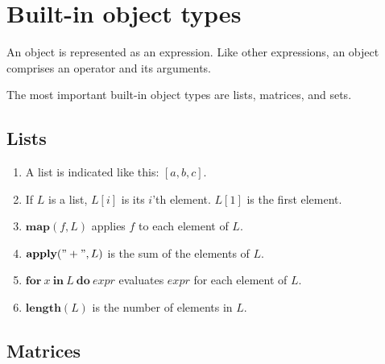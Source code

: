 \documentclass[12pt,leqno]{article}
\begin{document}
\section{Built-in object types}

An object is represented as an expression.
Like other expressions, an object comprises an operator and its arguments.

The most important built-in object types are lists, matrices, and sets.

\subsection{Lists}

\begin{enumerate}

\item A list is indicated like this: $[a, b, c]$.

\item If $L$ is a list, $L[i]$ is its $i$'th element. $L[1]$ is the first element.

\item $\mathbf{map}(\mathit{f}, L)$ applies $\mathit{f}$ to each element of $L$.

\item $\mathbf{apply}(\mathbf{"+"}, L)$ is the sum of the elements of $L$.

\item $\mathbf{for\ } x \mathbf{\ in \ } L \mathbf{\ do \ } \mathit{expr}$
    evaluates $\mathit{expr}$ for each element of $L$.

\item $\mathbf{length}(L)$ is the number of elements in $L$.

\end{enumerate}

\subsection{Matrices}
\end{document}
